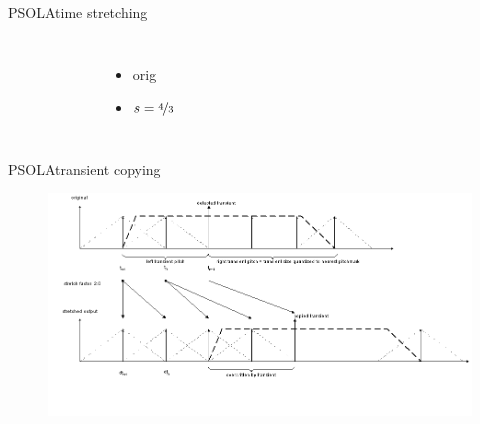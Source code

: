 \begin{frame}{PSOLA}{time stretching}
\begin{columns}
\begin{figure}
                    \end{figure}\vspace{-5mm}
                    \vspace{10mm}
                    \begin{itemize}
                        \item   {}\; orig
                        \item {}\; $s = \nicefrac{4}{3}$ 
                    \end{itemize}
            \end{columns}
            \vspace{50mm}
    \end{frame}
\begin{frame}{PSOLA}{transient copying}
				\begin{figure}
					\centerline{\includegraphics[scale=.3]{graph/transcpy}}
				\end{figure}
\end{frame}

